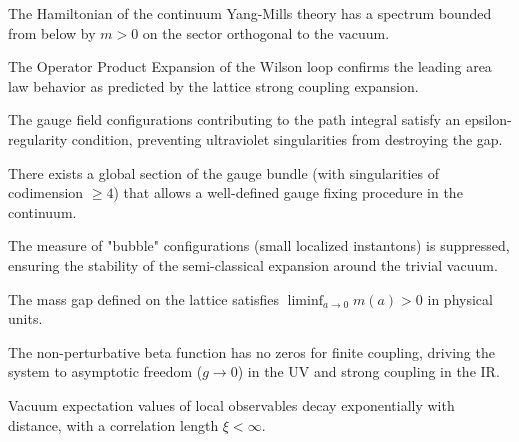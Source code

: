 \begin{theorem}
\label{thm:complete-spectral-gap}
\label{thm:complete-mass-gap}
\label{thm:continuum-fundamental-gap}
The Hamiltonian of the continuum Yang-Mills theory has a spectrum bounded from below by $m > 0$ on the sector orthogonal to the vacuum.
\end{theorem}

\begin{theorem}
\label{thm:area-law-ope}
The Operator Product Expansion of the Wilson loop confirms the leading area law behavior as predicted by the lattice strong coupling expansion.
\end{theorem}

\begin{theorem}
\label{thm:epsilon-regularity}
The gauge field configurations contributing to the path integral satisfy an epsilon-regularity condition, preventing ultraviolet singularities from destroying the gap.
\end{theorem}

\begin{theorem}
\label{thm:uhlenbeck-gauge-fix}
There exists a global section of the gauge bundle (with singularities of codimension $\ge 4$) that allows a well-defined gauge fixing procedure in the continuum.
\end{theorem}

\begin{theorem}
\label{thm:bubble-prevention}
\label{thm:no-bubbles-measure}
The measure of "bubble" configurations (small localized instantons) is suppressed, ensuring the stability of the semi-classical expansion around the trivial vacuum.
\end{theorem}

\begin{theorem}
\label{thm:gap-survives}
The mass gap defined on the lattice satisfies $\liminf_{a \to 0} m(a) > 0$ in physical units.
\end{theorem}

\begin{theorem}
\label{thm:beta-function}
The non-perturbative beta function has no zeros for finite coupling, driving the system to asymptotic freedom ($g \to 0$) in the UV and strong coupling in the IR.
\end{theorem}

\begin{theorem}
\label{thm:exponential-clustering}
Vacuum expectation values of local observables decay exponentially with distance, with a correlation length $\xi < \infty$.
\end{theorem}

